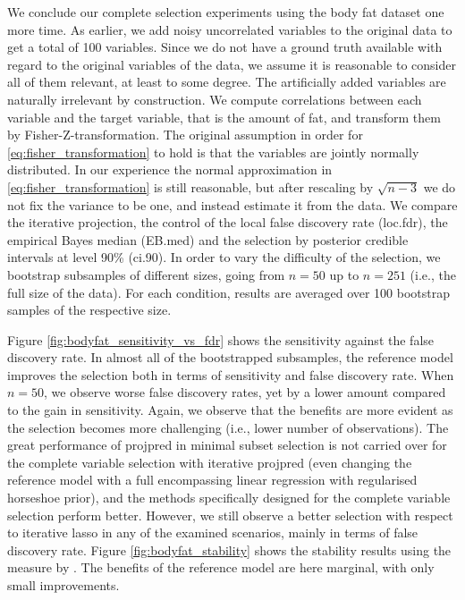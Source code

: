 \documentclass[a4]{article}
\theoremstyle{definition}
\begin{document}
We conclude our complete selection experiments using the body fat
dataset one more time. As earlier, we add noisy uncorrelated variables
to the original data to get a total of 100 variables.
Since we do not have a ground truth available with regard to the original
variables of the data, we assume it is reasonable to consider all of
them relevant, at least to some degree. The artificially added
variables are naturally irrelevant by construction.
We compute
correlations between each variable and the target variable, that is
the amount of fat, and transform them by Fisher-Z-transformation. The
original assumption in order for \eqref{eq:fisher_transformation} to
hold is that the variables are jointly normally distributed. In our
experience the normal approximation in
\eqref{eq:fisher_transformation} is still reasonable, but after
rescaling by $\sqrt{n-3}$ we do not fix the variance to be one, and
instead estimate it from the data. We compare the iterative projection, 
the control of the local false discovery rate (loc.fdr), 
the empirical Bayes median (EB.med)
and the selection by posterior credible intervals at level 90\%
(ci.90).  In order to vary the difficulty of the selection, we
bootstrap subsamples of different sizes, going from $n=50$ up to
$n=251$ (i.e., the full size of the data). For each condition, results
are averaged over 100 bootstrap samples of the respective size.

Figure \ref{fig:bodyfat_sensitivity_vs_fdr} shows the sensitivity
against the false discovery rate.  In almost all of the bootstrapped
subsamples, the reference
model improves the selection both in terms of sensitivity and false
discovery rate. When $n=50$, we observe worse false
discovery rates, yet by a lower amount compared to the gain in
sensitivity. Again, we observe that the benefits are more evident as
the selection becomes more challenging (i.e., lower number of
observations).
The great performance of projpred in minimal subset selection is not
carried over for the complete variable selection with iterative
projpred (even changing the reference model with a full encompassing 
linear regression with regularised horseshoe prior), and the methods 
specifically designed for the complete variable selection perform better. 
However, we still observe a better selection with respect to iterative lasso
in any of the examined scenarios, mainly in terms of false discovery rate.
Figure \ref{fig:bodyfat_stability} shows the stability
results using the measure by
\cite{paper:stability}. The benefits of the reference model are here
marginal, with only small improvements.
\end{document}
